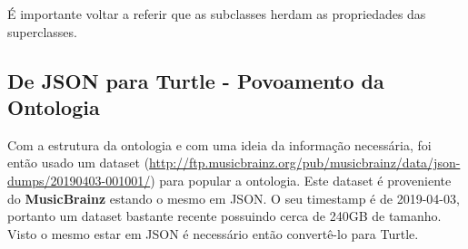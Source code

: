 \documentclass{article}
\begin{document}
É importante voltar a referir que as subclasses herdam as propriedades das superclasses.

\subsection{De JSON para Turtle - Povoamento da Ontologia}

Com a estrutura da ontologia e com uma ideia da informação necessária, foi então usado um dataset (\url{http://ftp.musicbrainz.org/pub/musicbrainz/data/json-dumps/20190403-001001/}) para popular a ontologia. Este dataset é proveniente do \textbf{MusicBrainz} estando o mesmo em JSON. O seu timestamp é de 2019-04-03, portanto um dataset bastante recente possuindo cerca de 240GB de tamanho. Visto o mesmo estar em JSON é necessário então convertê-lo para Turtle.
\end{document}
